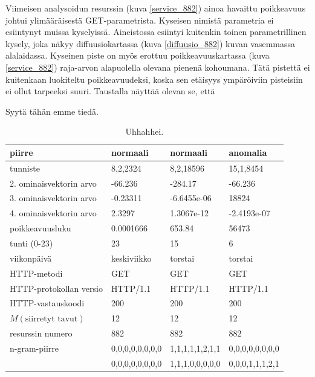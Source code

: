 Viimeisen analysoidun resurssin (kuva \ref{service_882}) ainoa
havaittu poikkeavuus johtui ylimääräisestä GET-parametrista. Kyseisen
nimistä parametria ei esiintynyt muissa kyselyissä. Aineistossa
esiintyi kuitenkin toinen parametrillinen kysely, joka näkyy
diffuusiokartassa (kuva \ref{diffuusio_882}) kuvan vasemmassa
alalaidassa. Kyseinen piste on myös erottuu poikkeavuuskartassa (kuva \ref{service_882})
raja-arvon alapuolella olevana pienenä kohoumana. Tätä pistettä ei
kuitenkaan luokiteltu poikkeavuudeksi, koska sen etäisyys ympäröiviin
pisteisiin ei ollut tarpeeksi suuri. Taustalla näyttää olevan se, että 

Syytä tähän emme tiedä.

\begin{table}[h]
\centering
\begin{tabular}{l|l|l|l}
piirre & normaali & normaali & anomalia \\
\hline
tunniste & 8,2,2324 & 8,2,18596 & 15,1,8454 \\
2. ominaisvektorin arvo & -66.236 & -284.17 & -66.236 \\
3. ominaisvektorin arvo & -0.23311 & -6.6455e-06 & 18824 \\
4. ominaisvektorin arvo & 2.3297 & 1.3067e-12 & -2.4193e-07 \\
poikkeavuusluku & 0.0001666 & 653.84 & 56473 \\
tunti (0-23) & 23 & 15 & 6 \\
viikonpäivä & keskiviikko & torstai & torstai \\
HTTP-metodi & GET & GET & GET \\
HTTP-protokollan versio & HTTP/1.1 & HTTP/1.1 & HTTP/1.1 \\
HTTP-vastauskoodi & 200 & 200 & 200 \\
$M(\text{siirretyt tavut})$ & 12 & 12 & 12 \\
resurssin numero & 882 & 882 & 882 \\
n-gram-piirre & 0,0,0,0,0,0,0,0 & 1,1,1,1,1,2,1,1 & 0,0,0,0,0,0,0,0 \\
& 0,0,0,0,0,0,0,0 & 1,1,1,0,0,0,0,0 & 0,0,0,1,1,1,2,1 \\ 

\end{tabular}
\caption{Uhhahhei.}
\label{ruma}
\end{table}


